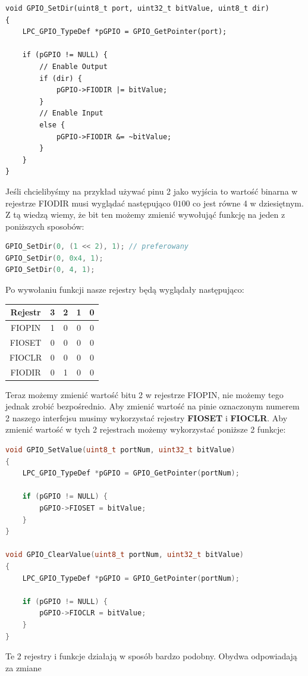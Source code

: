 \documentclass[11pt]{article}
\begin{document}
\begin{lstlisting}
void GPIO_SetDir(uint8_t port, uint32_t bitValue, uint8_t dir)
{
	LPC_GPIO_TypeDef *pGPIO = GPIO_GetPointer(port);

	if (pGPIO != NULL) {
		// Enable Output
		if (dir) {
			pGPIO->FIODIR |= bitValue;
		}
		// Enable Input
		else {
			pGPIO->FIODIR &= ~bitValue;
		}
	}
}
\end{lstlisting}
\newpage
Jeśli chcielibyśmy na przykład używać pinu 2 jako wyjścia to wartość binarna
w rejestrze FIODIR musi wyglądać następująco $0100$ co jest równe 4 w dziesiętnym.
Z tą wiedzą wiemy, że bit ten możemy zmienić wywołująć funkcję na jeden z poniższych sposobów:

\begin{lstlisting}[language=c]
GPIO_SetDir(0, (1 << 2), 1); // preferowany
GPIO_SetDir(0, 0x4, 1);
GPIO_SetDir(0, 4, 1);
\end{lstlisting}
Po wywołaniu funkcji nasze rejestry będą wyglądały następująco:
\begin{table}[H]
    \centering
    \begin{tabular}{|c|c|c|c|c|}
        \hline
        Rejestr & 3 & 2 & 1 & 0 \\ \hline
        FIOPIN & 1 & 0 & 0 & 0 \\ \hline
        FIOSET & 0 & 0 & 0 & 0 \\ \hline
        FIOCLR & 0 & 0 & 0 & 0 \\ \hline
        FIODIR & 0 & 1 & 0 & 0 \\ \hline
    \end{tabular}
\end{table}
Teraz możemy zmienić wartość bitu 2 w rejestrze FIOPIN, nie możemy tego jednak zrobić
bezpośrednio. Aby zmienić wartość na pinie oznaczonym numerem 2 naszego interfejsu
musimy wykorzystać rejestry \textbf{FIOSET} i \textbf{FIOCLR}. Aby zmienić wartość
w tych 2 rejestrach możemy wykorzystać poniższe 2 funkcje:
\begin{lstlisting}[language=c]
void GPIO_SetValue(uint8_t portNum, uint32_t bitValue)
{
    LPC_GPIO_TypeDef *pGPIO = GPIO_GetPointer(portNum);

    if (pGPIO != NULL) {
        pGPIO->FIOSET = bitValue;
    }
}

void GPIO_ClearValue(uint8_t portNum, uint32_t bitValue)
{
	LPC_GPIO_TypeDef *pGPIO = GPIO_GetPointer(portNum);

	if (pGPIO != NULL) {
		pGPIO->FIOCLR = bitValue;
	}
}
\end{lstlisting}
Te 2 rejestry i funkcje działają w sposób bardzo podobny. Obydwa odpowiadają za zmiane
\end{document}
